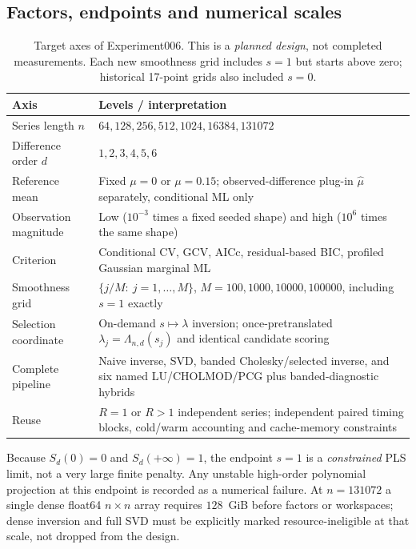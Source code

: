 \subsection{Factors, endpoints and numerical scales}
\begin{table}[t]\caption{Target axes of Experiment006. This is a \emph{planned design}, not completed measurements. Each new smoothness grid includes $s=1$ but starts above zero; historical 17-point grids also included $s=0$.}
\label{tab:factor_levels}\centering
\setlength{\tabcolsep}{5pt}
\begin{tabular}{@{}p{}p{}@{}}\toprule
Axis & Levels / interpretation\\\midrule
Series length $n$ & $64,128,256,512,1024,16384,131072$\\
Difference order $d$ & $1,2,3,4,5,6$\\
Reference mean & Fixed $\mu=0$ or $\mu=0.15$; observed-difference plug-in $\widehat\mu$ separately, conditional ML only\\
Observation magnitude & Low ($10^{-3}$ times a fixed seeded shape) and high ($10^6$ times the same shape)\\
Criterion & Conditional CV, GCV, AICc, residual-based BIC, profiled Gaussian marginal ML\\
Smoothness grid & $\{j/M:\ j=1,\ldots,M\}$, $M=100,1000,10000,100000$, including $s=1$ exactly\\
Selection coordinate & On-demand $s\mapsto\lambda$ inversion; once-pretranslated $\lambda_j=\Lambda_{n,d}(s_j)$ and identical candidate scoring\\
Complete pipeline & Naive inverse, SVD, banded Cholesky/selected inverse, and six named LU/CHOLMOD/PCG plus banded-diagnostic hybrids\\
Reuse & $R=1$ or $R>1$ independent series; independent paired timing blocks, cold/warm accounting and cache-memory constraints\\
\bottomrule\end{tabular}
\end{table}

Because $S_d(0)=0$ and $S_d(+\infty)=1$, the endpoint $s=1$ is a \emph{constrained} PLS limit, not a very large finite penalty. Any unstable high-order polynomial projection at this endpoint is recorded as a numerical failure. At $n=131072$ a single dense float64 $n\times n$ array requires $128$~GiB before factors or workspaces; dense inversion and full SVD must be explicitly marked resource-ineligible at that scale, not dropped from the design.


